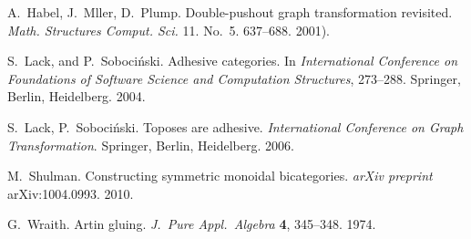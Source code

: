 \documentclass{amsart}
\theoremstyle{remark}
\theoremstyle{definition}
\begin{document}
\begin{thebibliography}{99}
 A.~Habel, J.~Mller,
  D.~Plump. Double-pushout graph transformation
  revisited. \emph{Math. Structures Comput. Sci.}
  11. No.~5. 637--688. 2001).
  
 S.\ Lack, and P.\ Soboci\'{n}ski. Adhesive
  categories. In \emph{International Conference on Foundations of
    Software Science and Computation Structures}, 273--288. Springer,
  Berlin, Heidelberg. 2004.

 S.~Lack, P.~Soboci\'{n}ski. Toposes are adhesive. \emph{International Conference on Graph Transformation}. Springer, Berlin, Heidelberg. 2006.

 M.~Shulman. Constructing symmetric monoidal bicategories. \emph{arXiv preprint} arXiv:1004.0993. 2010.
  
 G.\ Wraith. Artin gluing. \emph{J.\ Pure
    Appl.\ Algebra} \textbf{4}, 345--348. 1974.

\end{thebibliography}
\end{document}
